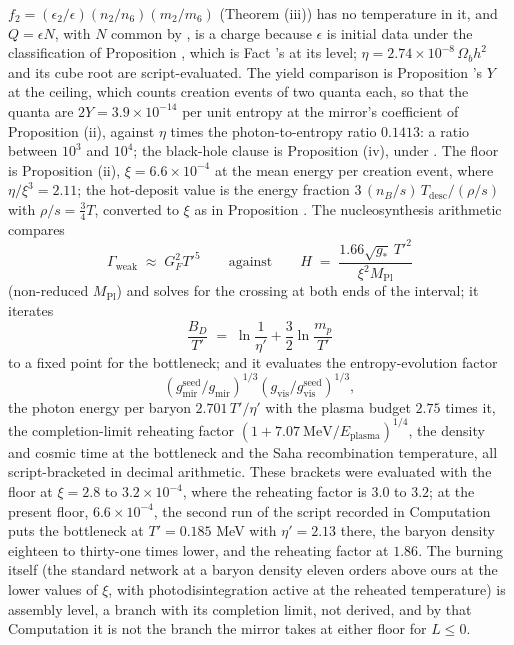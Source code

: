 $f_{2} = (\epsilon_{2}/\epsilon)(n_{2}/n_{6})(m_{2}/m_{6})$ (Theorem (iii)) has no temperature in it, and $Q = \epsilon N$, with $N$ common by , is a charge because $\epsilon$ is initial data under the classification of Proposition , which is Fact 's at its level; $\eta = 2.74 \times 10^{-8}\,\Omega_{b}h^{2}$ and its cube root are script-evaluated. The yield comparison is Proposition 's $Y$ at the ceiling, which counts creation events of two quanta each, so that the quanta are $2Y = 3.9 \times 10^{-14}$ per unit entropy at the mirror's coefficient of Proposition (ii), against $\eta$ times the photon-to-entropy ratio $0.1413$: a ratio between $10^{3}$ and $10^{4}$; the black-hole clause is Proposition (iv), under . The floor is Proposition (ii), $\xi = 6.6 \times 10^{-4}$ at the mean energy per creation event, where $\eta/\xi^{3} = 2.11$; the hot-deposit value is the energy fraction $3\,(n_{B}/s)\,T_{\mathrm{desc}}/(\rho/s)$ with $\rho/s = \tfrac{3}{4}T$, converted to $\xi$ as in Proposition . The nucleosynthesis arithmetic compares
\[
\Gamma_{\mathrm{weak}} \;\approx\; G_{F}^{2}T'^{5} \qquad\text{against}\qquad H \;=\; \frac{1.66\sqrt{g_{*}}\,T'^{2}}{\xi^{2}M_{\mathrm{Pl}}}
\]
(non-reduced $M_{\mathrm{Pl}}$) and solves for the crossing at both ends of the interval; it iterates
\[
\frac{B_{D}}{T'} \;=\; \ln\frac{1}{\eta'} + \frac{3}{2}\ln\frac{m_{p}}{T'}
\]
to a fixed point for the bottleneck; and it evaluates the entropy-evolution factor
\[
(g_{\mathrm{mir}}^{\mathrm{seed}}/g_{\mathrm{mir}})^{1/3}(g_{\mathrm{vis}}/g_{\mathrm{vis}}^{\mathrm{seed}})^{1/3},
\]
the photon energy per baryon $2.701\,T'/\eta'$ with the plasma budget $2.75$ times it, the completion-limit reheating factor $(1 + 7.07\ \mathrm{MeV}/E_{\mathrm{plasma}})^{1/4}$, the density and cosmic time at the bottleneck and the Saha recombination temperature, all script-bracketed in decimal arithmetic. These brackets were evaluated with the floor at $\xi = 2.8$ to $3.2 \times 10^{-4}$, where the reheating factor is $3.0$ to $3.2$; at the present floor, $6.6 \times 10^{-4}$, the second run of the script recorded in Computation  puts the bottleneck at $T' = 0.185$ MeV with $\eta' = 2.13$ there, the baryon density eighteen to thirty-one times lower, and the reheating factor at $1.86$. The burning itself (the standard network at a baryon density eleven orders above ours at the lower values of $\xi$, with photodisintegration active at the reheated temperature) is assembly level, a branch with its completion limit, not derived, and by that Computation it is not the branch the mirror takes at either floor for $L \leq 0$.

